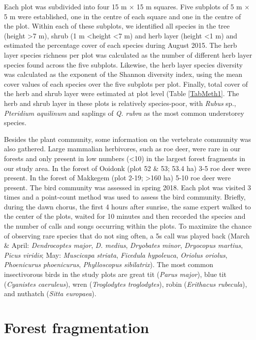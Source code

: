 \documentclass[b5paper,10pt]{book} %
\begin{document}
	Each plot was subdivided into four 15 m $\times$ 15 m squares. Five subplots of 5 m $\times$ 5 m were established, one in the centre of each square and one in the centre of the plot. Within each of these subplots, we identified all species in the tree (height \textgreater 7 m), shrub (1 m \textless height \textless 7 m) and herb layer (height \textless 1 m) and estimated the percentage cover of each species during August 2015. The herb layer species richness per plot was calculated as the number of different herb layer species found across the five subplots. Likewise, the herb layer species diversity was calculated as the exponent of the Shannon diversity index, using the mean cover values of each species over the five subplots per plot. Finally, total cover of the herb and shrub layer were estimated at plot level (Table \ref{TabMeth1}. The herb and shrub layer in these plots is relatively species-poor, with \textit{Rubus} sp., \textit{Pteridium aquilinum} and saplings of \textit{Q. rubra} as the most common understorey species. 

	Besides the plant community, some information on the vertebrate community was also gathered. Large mammalian herbivores, such as roe deer, were rare in our forests and only present in low numbers (\textless 10) in the largest forest fragments in our study area. In the forest of Ooidonk (plot 52 \& 53; 53.4 ha) 3-5 roe deer were present. In the forest of Makkegem (plot 2-19; \textgreater160 ha) 5-10 roe deer were present. The bird community was assessed in spring 2018. Each plot was visited 3 times and a point-count method was used to assess the bird community. Briefly, during the dawn chorus, the first 4 hours after sunrise, the same expert walked to the center of the plots, waited for 10 minutes and then recorded the species and the number of calls and songs occurring within the plots. To maximize the chance of observing rare species that do not sing often, a 5s call was played back (March \& April: \textit{Dendrocoptes major}, \textit{D. medius}, \textit{Dryobates minor}, \textit{Dryocopus martius}, \textit{Picus viridis}; May: \textit{Muscicapa striata}, \textit{Ficedula hypoleuca}, \textit{Oriolus oriolus}, \textit{Phoenicurus phoenicurus}, \textit{Phylloscopus sibilatrix}). The most common insectivorous birds in the study plots are great tit (\textit{Parus major}), blue tit (\textit{Cyanistes caeruleus}), wren (\textit{Troglodytes troglodytes}), robin (\textit{Erithacus rubecula}), and nuthatch (\textit{Sitta europaea}). 

	\section{Forest fragmentation}
\end{document}

